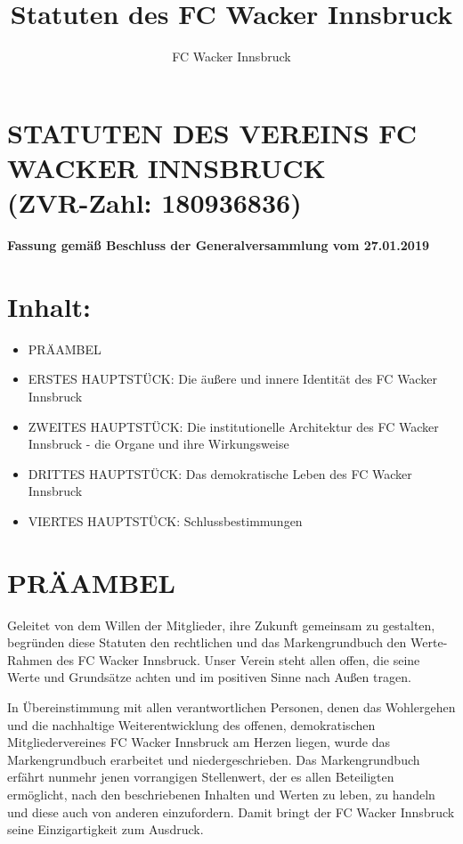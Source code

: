 \documentclass[10pt,a4paper]{article}
\author{FC Wacker Innsbruck}
\title{Statuten des FC Wacker Innsbruck}
\begin{document}
\setlength{\parskip}{25pt}
\setcounter{secnumdepth}{0}

\section{STATUTEN DES VEREINS FC WACKER INNSBRUCK\\(ZVR-Zahl: 180936836)}

\textbf{Fassung gemäß Beschluss der Generalversammlung vom 27.01.2019}

\section{Inhalt:}

\begin{itemize}
\item
PRÄAMBEL

\item
ERSTES HAUPTSTÜCK: Die äußere und innere Identität des FC Wacker Innsbruck

\item
ZWEITES HAUPTSTÜCK: Die institutionelle Architektur des FC Wacker Innsbruck - die Organe und ihre Wirkungsweise

\item
DRITTES HAUPTSTÜCK: Das demokratische Leben des FC Wacker Innsbruck

\item
VIERTES HAUPTSTÜCK: Schlussbestimmungen
\end{itemize}

\section{PRÄAMBEL}

Geleitet von dem Willen der Mitglieder, ihre Zukunft gemeinsam zu gestalten, begründen diese Statuten den rechtlichen und das Markengrundbuch den Werte-Rahmen des FC Wacker Innsbruck.
Unser Verein steht allen offen, die seine Werte und Grundsätze achten und im positiven Sinne nach Außen tragen.

In Übereinstimmung mit allen verantwortlichen Personen, denen das Wohlergehen und die nachhaltige Weiterentwicklung des offenen, demokratischen Mitgliedervereines FC Wacker Innsbruck am Herzen liegen, wurde das Markengrundbuch erarbeitet und niedergeschrieben.
Das Markengrundbuch erfährt nunmehr jenen vorrangigen Stellenwert, der es allen Beteiligten ermöglicht, nach den beschriebenen Inhalten und Werten zu leben, zu handeln und diese auch von anderen einzufordern.
Damit bringt der FC Wacker Innsbruck seine Einzigartigkeit zum Ausdruck.
\end{document}
